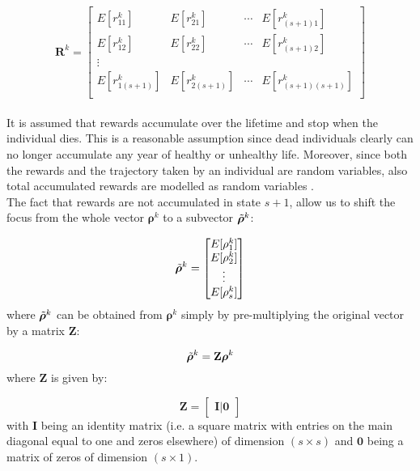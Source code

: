 \documentclass[\main/main.tex]{subfiles}
\begin{document}
\begin{equation}
 \bm{R}^{k} = 
 \begin{bmatrix}
  E[r^k_{11}]  &  E[r^k_{21}]  & \cdots &  E[r^k_{(s+1)1}] \\
E[r^k_{12}]  &  E[r^k_{22}]  & \cdots &  E[r^k_{(s+1)2}] \\
\vdots & & &\\
  E[r^k_{1(s+1)}]  &  E[r^k_{2(s+1)}]  & \cdots &  E[r^k_{(s+1)(s+1)}] \\
 \end{bmatrix}
\end{equation}
\\

\noindent It is assumed that rewards accumulate over the lifetime and stop when the individual dies. This is a reasonable assumption since dead individuals clearly can no longer accumulate any year of healthy or unhealthy life. Moreover, since both the rewards and the trajectory taken by an individual are random variables, also total accumulated rewards are modelled as random variables \citep{Caswell2011}.\\
The fact that rewards are not accumulated in state $s+1$, allow us to shift the focus from the whole vector $\bm{\rho}^k$ to a subvector $\Tilde{\bm{\rho}}^k$:

\begin{equation}
\Tilde{\bm{\rho}}^k =
\begin{bmatrix}
E[\rho^k_1]\\
E[\rho^k_2]\\
\vdots\\
E[\rho^k_{s}]
\end{bmatrix}
\end{equation}
where $\Tilde{\bm{\rho}}^k$ can be obtained from $\bm{\rho}^k$ simply by pre-multiplying the original vector by a matrix $\mathbf{Z}$: 

\begin{equation}
    \Tilde{\bm{\rho}}^k = \mathbf{Z}\bm{\rho}^k
\end{equation}
where $\mathbf{Z}$ is given by:

\begin{equation}
\mathbf{Z}=
    \begin{bmatrix}
    \mathbf{I} | \mathbf{0}
    \end{bmatrix}
\end{equation}
with $\mathbf{I}$ being an identity matrix (i.e. a square matrix with entries on the main diagonal equal to one and zeros elsewhere)  of dimension $(s \times s) $ and $\mathbf{0}$ being a matrix of zeros of dimension $(s \times 1) $. \\ 
\end{document}
